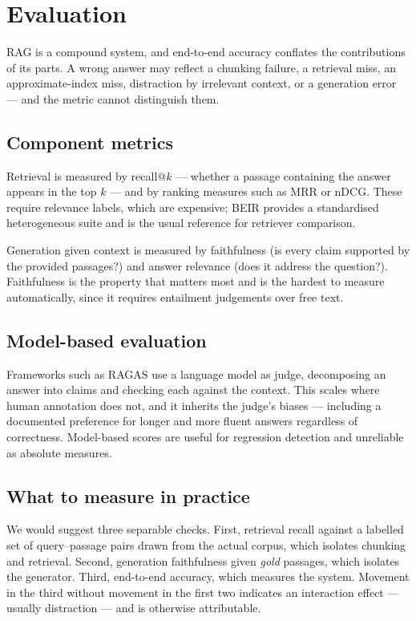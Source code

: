\documentclass[11pt,a4paper]{article}
\begin{document}
\section{Evaluation}
\label{sec:evaluation}

RAG is a compound system, and end-to-end accuracy conflates the contributions
of its parts. A wrong answer may reflect a chunking failure, a retrieval miss,
an approximate-index miss, distraction by irrelevant context, or a generation
error --- and the metric cannot distinguish them.

\subsection{Component metrics}

Retrieval is measured by recall@$k$ --- whether a passage containing the
answer appears in the top $k$ --- and by ranking measures such as MRR or
nDCG. These require relevance labels, which are expensive; BEIR
\cite{thakur2021} provides a standardised heterogeneous suite and is the usual
reference for retriever comparison.

Generation given context is measured by faithfulness (is every claim supported
by the provided passages?) and answer relevance (does it address the
question?). Faithfulness is the property that matters most and is the hardest
to measure automatically, since it requires entailment judgements over free
text.

\subsection{Model-based evaluation}

Frameworks such as RAGAS \cite{es2024} use a language model as judge,
decomposing an answer into claims and checking each against the context. This
scales where human annotation does not, and it inherits the judge's biases ---
including a documented preference for longer and more fluent answers
regardless of correctness. Model-based scores are useful for regression
detection and unreliable as absolute measures.

\subsection{What to measure in practice}

We would suggest three separable checks. First, retrieval recall against a
labelled set of query--passage pairs drawn from the actual corpus, which
isolates chunking and retrieval. Second, generation faithfulness given
\emph{gold} passages, which isolates the generator. Third, end-to-end accuracy,
which measures the system. Movement in the third without movement in the first
two indicates an interaction effect --- usually distraction --- and is
otherwise attributable.
\end{document}
